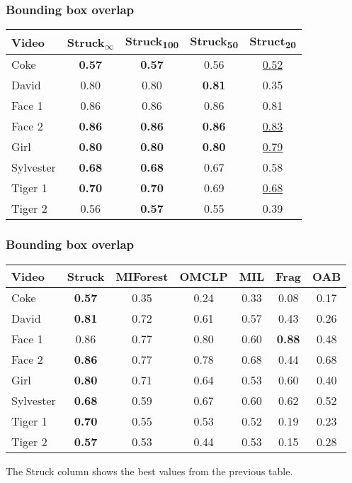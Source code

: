 \documentclass[mathserif,handout]{beamer}
\begin{document}
\begin{frame}
    \frametitle{Bounding box overlap}
    \begin{tabular}{l c c c c }
        \toprule
        Video & Struck\textsubscript{$\infty$} & Struck\textsubscript{100} & Struck\textsubscript{50} & Struct\textsubscript{20} \\
        \midrule
        Coke      & \textbf{0.57} & \textbf{0.57} &         0.56  & \underline{0.52} \\
        David     &         0.80  &         0.80  & \textbf{0.81} &            0.35  \\
        Face 1    &         0.86  &         0.86  &         0.86  &            0.81  \\
        Face 2    & \textbf{0.86} & \textbf{0.86} & \textbf{0.86} & \underline{0.83} \\
        Girl      & \textbf{0.80} & \textbf{0.80} & \textbf{0.80} & \underline{0.79} \\
        Sylvester & \textbf{0.68} & \textbf{0.68} &         0.67  &            0.58  \\
        Tiger 1   & \textbf{0.70} & \textbf{0.70} &         0.69  & \underline{0.68} \\
        Tiger 2   &         0.56  & \textbf{0.57} &         0.55  &            0.39  \\
        \bottomrule
    \end{tabular}
\end{frame}

\begin{frame}
    \frametitle{Bounding box overlap}
    \begin{tabular}{l c c c c c c }
        \toprule
        Video & Struck & MIForest & OMCLP & MIL & Frag & OAB \\
        \midrule
        Coke      & \textbf{0.57} & 0.35 & 0.24 & 0.33 &         0.08  & 0.17 \\
        David     & \textbf{0.81} & 0.72 & 0.61 & 0.57 &         0.43  & 0.26 \\
        Face 1    &         0.86  & 0.77 & 0.80 & 0.60 & \textbf{0.88} & 0.48 \\
        Face 2    & \textbf{0.86} & 0.77 & 0.78 & 0.68 &         0.44  & 0.68 \\
        Girl      & \textbf{0.80} & 0.71 & 0.64 & 0.53 &         0.60  & 0.40 \\
        Sylvester & \textbf{0.68} & 0.59 & 0.67 & 0.60 &         0.62  & 0.52 \\
        Tiger 1   & \textbf{0.70} & 0.55 & 0.53 & 0.52 &         0.19  & 0.23 \\
        Tiger 2   & \textbf{0.57} & 0.53 & 0.44 & 0.53 &         0.15  & 0.28 \\
        \bottomrule
    \end{tabular}

    The Struck column shows the best values from the previous table.
\end{frame}
\end{document}
